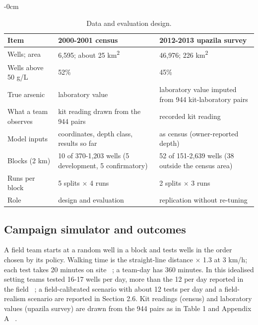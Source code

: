 \documentclass[sustainability,article,submit,pdftex,moreauthors]{Definitions/mdpi}
\begin{document}
\begin{table}[!htbp]
\caption{Data and evaluation design.}
\label{tab1}
\footnotesize
\begin{adjustwidth}{-\extralength}{0cm}\centering
\begin{tabular}{p{3.4cm}p{5.2cm}p{5.2cm}}
\toprule
\textbf{Item} & \textbf{2000-2001 census} & \textbf{2012-2013 upazila survey} \\
\midrule
Wells; area & 6,595; about 25 km\textsuperscript{2} & 46,976; 226 km\textsuperscript{2} \\
Wells above 50 \textmu{}g/L & 52\% & 45\% \\
True arsenic & laboratory value & laboratory value imputed from 944 kit-laboratory pairs \\
What a team observes & kit reading drawn from the 944 pairs & recorded kit reading \\
Model inputs & coordinates, depth class, results so far & as census (owner-reported depth) \\
Blocks (2 km) & 10 of 370-1,203 wells (5 development, 5 confirmatory) & 52 of 151-2,639 wells (38 outside the census area) \\
Runs per block & 5 splits $\times$ 4 runs & 2 splits $\times$ 3 runs \\
Role & design and evaluation & replication without re-tuning \\
\bottomrule
\end{tabular}
\end{adjustwidth}
\end{table}

\subsection{Campaign simulator and outcomes}

A field team starts at a random well in a block and tests wells in the order chosen by its policy. Walking time is the straight-line distance $\times$ 1.3 at 3 km/h; each test takes 20 minutes on site ~\cite{George2012,vanGeen2019}; a team-day has 360 minutes. In this idealised setting teams tested 16-17 wells per day, more than the 12 per day reported in the field ~\cite{vanGeen2014}; a field-calibrated scenario with about 12 tests per day and a field-realism scenario are reported in Section 2.6. Kit readings (census) and laboratory values (upazila survey) are drawn from the 944 pairs as in Table 1 and Appendix A ~\cite{Jameel2021}.
\end{document}

